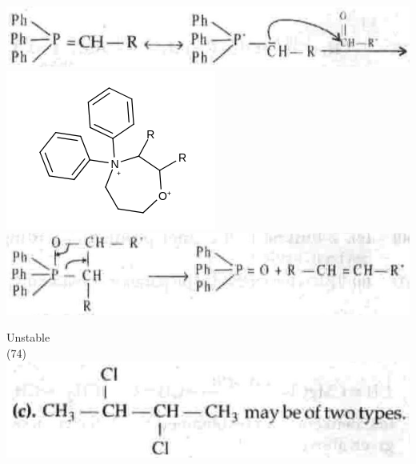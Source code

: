 \documentclass[10pt]{article}
\begin{document}
\includegraphics[max width=\textwidth, center]{2025_01_28_8470952b98110cec3aabg-244(1)}\\
\includegraphics{smile-30519081bb8ce61c5298768d259a0100cdda240e}\\
\includegraphics[max width=\textwidth, center]{2025_01_28_8470952b98110cec3aabg-244}

Unstable\\
(74)\\
\includegraphics[max width=\textwidth, center]{2025_01_28_8470952b98110cec3aabg-244(3)}
\end{document}
